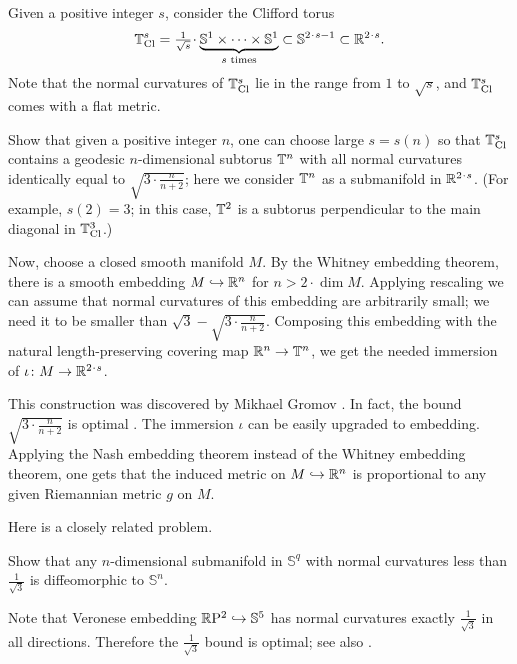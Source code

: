 Given a positive integer $s$,
consider the Clifford torus
\[\TT^s_{\text{Cl}}=\tfrac1{\sqrt{s}}\cdot\underbrace{\SSS^1\times\dots\times\SSS^1}_\text{$s$ times}\subset\SSS^{2\cdot s-1}\subset\RR^{2\cdot s}.\]
Note that the normal curvatures of $\mathbb{T}^s_{\text{Cl}}$ lie in the range from $1$ to $\sqrt{s}$, and $\mathbb{T}^s_{\text{Cl}}$ comes with a flat metric.

Show that given a positive integer $n$, one can choose large $s=s(n)$
so that $\mathbb{T}^s_{\text{Cl}}$ contains a geodesic $n$-dimensional
subtorus $\mathbb{T}^n$ with all normal curvatures identically equal to $\sqrt{3\cdot\frac n{n+2}}$;
here we consider $\mathbb{T}^n$ as a submanifold in $\RR^{2\cdot s}$.
(For example, $s(2)=3$; in this case, $\mathbb{T}^2$ is a subtorus perpendicular to the main diagonal in $\mathbb{T}^3_{\text{Cl}}$.) 

Now, choose a closed smooth manifold $M$.
By the Whitney embedding theorem, there is a smooth embedding $M\hookrightarrow\mathbb{R}^n$ for $n>2\cdot \dim M$.
Applying rescaling we can assume that normal curvatures of this embedding are arbitrarily small;
we need it to be smaller than $\sqrt{3}-\sqrt{3\cdot\frac n{n+2}}$.
Composing this embedding with the natural length-preserving covering map $\mathbb{R}^n\to \mathbb{T}^n$, we get the needed immersion of $\iota\:M\to \RR^{2\cdot s}$.
\qeds

This construction was discovered by Mikhael Gromov \cite[2.A]{gromov2022}.
In fact, the bound $\sqrt{3\cdot\frac n{n+2}}$ is optimal \cite{petrunin2023}.
The immersion $\iota$ can be easily upgraded to embedding.
Applying the Nash embedding theorem instead of the Whitney embedding theorem,
one gets that the induced metric on $M\hookrightarrow\mathbb{R}^n$ is proportional to any given Riemannian metric $g$ on $M$.

Here is a closely related problem.

\begin{pr}
Show that any $n$-dimensional submanifold in $\mathbb{S}^q$ with normal curvatures less than $\tfrac1{\sqrt{3}}$ is diffeomorphic to $\mathbb{S}^n$. 
\end{pr}

Note that Veronese embedding $\mathbb{R}\mathrm{P}^2\hookrightarrow\mathbb{S}^5$ has normal curvatures exactly $\tfrac1{\sqrt{3}}$ in all directions.
Therefore the $\tfrac1{\sqrt{3}}$ bound is optimal;
see also \cite{petrunin-RPn}.





